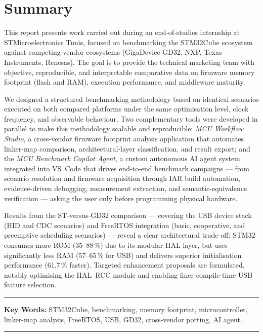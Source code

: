 \chapter*{Summary}


This report presents work carried out during an end-of-studies internship at STMicroelectronics Tunis, focused on benchmarking the STM32Cube ecosystem against competing vendor ecosystems (GigaDevice GD32, NXP, Texas Instruments, Renesas). The goal is to provide the technical marketing team with objective, reproducible, and interpretable comparative data on firmware memory footprint (flash and RAM), execution performance, and middleware maturity.

We designed a structured benchmarking methodology based on identical scenarios executed on both compared platforms under the same optimisation level, clock frequency, and observable behaviour. Two complementary tools were developed in parallel to make this methodology scalable and reproducible: \emph{MCU Workflow Studio}, a cross-vendor firmware footprint analysis application that automates linker-map comparison, architectural-layer classification, and result export; and the \emph{MCU Benchmark Copilot Agent}, a custom autonomous AI agent system integrated into VS~Code that drives end-to-end benchmark campaigns --- from scenario resolution and firmware acquisition through IAR build automation, evidence-driven debugging, measurement extraction, and semantic-equivalence verification --- asking the user only before programming physical hardware.

Results from the ST-versus-GD32 comparison --- covering the USB device stack (HID and CDC scenarios) and FreeRTOS integration (basic, cooperative, and preemptive scheduling scenarios) --- reveal a clear architectural trade-off: STM32 consumes more ROM (35--88\,\%) due to its modular HAL layer, but uses significantly less RAM (57--65\,\% for USB) and delivers superior initialisation performance (61.7\,\% faster). Targeted enhancement proposals are formulated, notably optimising the HAL~RCC module and enabling finer compile-time USB feature selection.

\noindent\rule[2pt]{\textwidth}{0.5pt}

{\textbf{Key Words:}}
STM32Cube, benchmarking, memory footprint, microcontroller, linker-map analysis, FreeRTOS, USB, GD32, cross-vendor porting, AI agent.
\\
\noindent\rule[2pt]{\textwidth}{0.5pt}